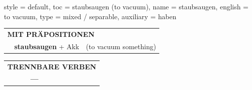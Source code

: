 \begin{verbentry}{
  style = {default},
  toc = {staubsaugen (to vacuum)},
  name = {staubsaugen},
  english = {to vacuum},
  type = {mixed / separable},
  auxiliary = {haben}
}
\vspace{10pt}

\begin{tabular}{lll}
\multicolumn{3}{l}{\textbf{MIT PRÄPOSITIONEN}}\\
& \textbf{staubsaugen} + Akk & (to vacuum something)\\
\end{tabular}
\hfill
\begin{tabular}{lll}
\multicolumn{3}{l}{\textbf{TRENNBARE VERBEN}}\\
& \textbf{---} & \\
\end{tabular}

\vspace{-5pt}
\end{verbentry}

